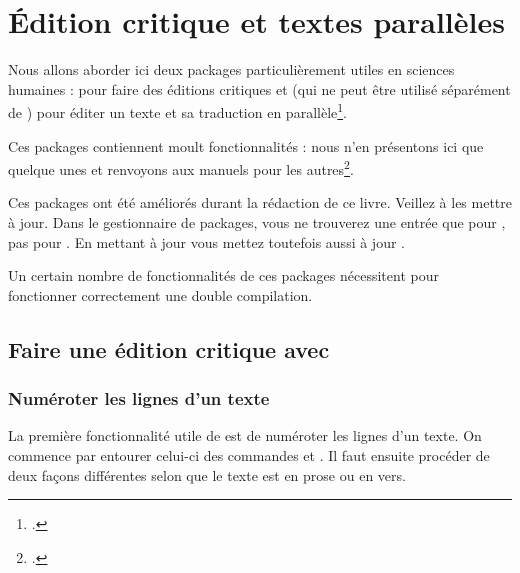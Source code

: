 \chapter{Édition critique et textes parallèles}  \label{ledmac}


\begin{intro}
Nous allons aborder ici deux packages particulièrement utiles en sciences humaines :  pour faire des éditions critiques et  (qui ne peut être utilisé séparément de ) pour éditer un texte et sa traduction en parallèle\footcite[Il existe un livre d'introduction aux éditions critiques avec \XeLaTeX :][]{leal2012}.

Ces packages contiennent moult fonctionnalités : nous n'en présentons ici que quelque unes et renvoyons aux manuels pour les autres\footcites{ledmac}{ledpar}. 
\end{intro}

\begin{attention}
Ces packages ont été améliorés durant la rédaction de ce livre. Veillez à les mettre à jour.
Dans le gestionnaire de packages, vous ne trouverez une entrée que pour  ,  pas pour .  En mettant à jour  vous mettez toutefois aussi à jour  .
\end{attention}

\begin{attention}
Un certain nombre de fonctionnalités de ces packages nécessitent pour fonctionner correctement une double compilation.
\end{attention}



\section{Faire une édition critique avec }

\subsection{Numéroter les lignes d'un texte}

La première fonctionnalité utile de  est de numéroter les lignes d'un texte. On commence par  entourer celui-ci des commandes  et . Il faut ensuite procéder de deux façons différentes  selon que le texte est en prose ou en vers.

